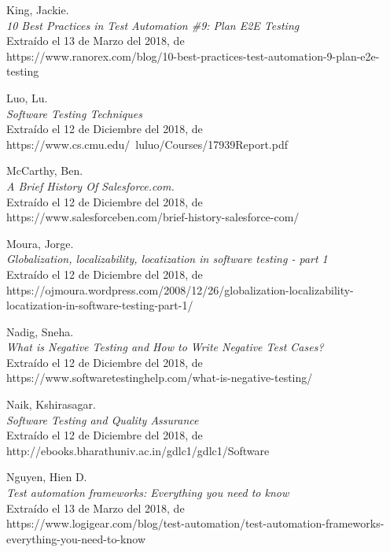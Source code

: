 \begin{thebibliography}{99}
 King, Jackie.\\
\emph{10 Best Practices in Test Automation \#9: Plan E2E Testing}\\
Extraído el 13 de Marzo del 2018, de\\
https://www.ranorex.com/blog/10-best-practices-test-automation-9-plan-e2e-testing

 Luo, Lu.\\
\emph{Software Testing Techniques}\\
Extraído el 12 de Diciembre del 2018, de\\
https://www.cs.cmu.edu/~luluo/Courses/17939Report.pdf

 McCarthy, Ben.\\
\emph{A Brief History Of Salesforce.com.}\\
Extraído el 12 de Diciembre del 2018, de\\
https://www.salesforceben.com/brief-history-salesforce-com/

 Moura, Jorge.\\
\emph{Globalization, localizability, locatization in software testing - part 1}\\
Extraído el 12 de Diciembre del 2018, de\\
https://ojmoura.wordpress.com/2008/12/26/globalization-localizability-locatization-in-software-testing-part-1/

 Nadig, Sneha.\\
\emph{What is Negative Testing and How to Write Negative Test Cases?}\\
Extraído el 12 de Diciembre del 2018, de\\
https://www.softwaretestinghelp.com/what-is-negative-testing/

 Naik, Kshirasagar.\\
\emph{Software Testing and Quality Assurance}\\
Extraído el 12 de Diciembre del 2018, de\\
http://ebooks.bharathuniv.ac.in/gdlc1/gdlc1/Software%

 Nguyen, Hien D.\\
\emph{Test automation frameworks: Everything you need to know}\\
Extraído el 13 de Marzo del 2018, de\\
https://www.logigear.com/blog/test-automation/test-automation-frameworks-everything-you-need-to-know


\end{thebibliography}
